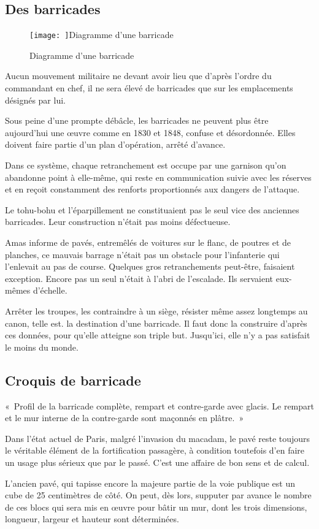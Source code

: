 \documentclass[french,twoside]{book} %
\begin{document}
\subsection[Des barricades]{Des barricades}
\begin{figure}[htbp]
\noindent\noindent\texttt{[image: ]}Diagramme d’une barricade
\caption{Diagramme d’une barricade}\end{figure}
\noindent Aucun mouvement militaire ne devant avoir lieu que d’après l’ordre du commandant en chef, il ne sera élevé de barricades que sur les emplacements désignés par lui.\par
Sous peine d’une prompte débâcle, les barricades ne peuvent plus être aujourd’hui une œuvre comme en 1830 et 1848, confuse et désordonnée. Elles doivent faire partie d’un plan d’opération, arrêté d’avance.\par
Dans ce système, chaque retranchement est occupe par une garnison qu’on abandonne point à elle-même, qui reste en communication suivie avec les réserves et en reçoit constamment des renforts proportionnés aux dangers de l’attaque.\par
Le tohu-bohu et l’éparpillement ne constituaient pas le seul vice des anciennes barricades. Leur construction n’était pas moins défectueuse.\par
Amas informe de pavés, entremêlés de voitures sur le flanc, de poutres et de planches, ce mauvais barrage n’était pas un obstacle pour l’infanterie qui l’enlevait au pas de course. Quelques gros retranchements peut-être, faisaient exception. Encore pas un seul n’était à l’abri de l’escalade. Ils servaient eux-mêmes d’échelle.\par
Arrêter les troupes, les contraindre à un siège, résister même assez longtemps au canon, telle est. la destination d’une barricade. Il faut donc la construire d’après ces données, pour qu’elle atteigne son triple but. Jusqu’ici, elle n’y a pas satisfait le moins du monde.
\subsection[Croquis de barricade]{Croquis de barricade}
\noindent « Profil de la barricade complète, rempart et contre-garde avec glacis. Le rempart et le mur interne de la contre-garde sont maçonnés en plâtre. »\par
Dans l’état actuel de Paris, malgré l’invasion du macadam, le pavé reste toujours le véritable élément de la fortification passagère, à condition toutefois d’en faire un usage plus sérieux que par le passé. C'est une affaire de bon sens et de calcul.\par
L'ancien pavé, qui tapisse encore la majeure partie de la voie publique est un cube de 25 centimètres de côté. On peut, dès lors, supputer par avance le nombre de ces blocs qui sera mis en œuvre pour bâtir un mur, dont les trois dimensions, longueur, largeur et hauteur sont déterminées.
\end{document}
